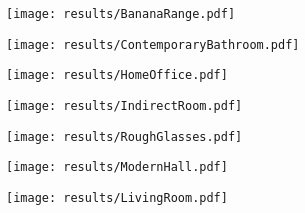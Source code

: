 \documentclass[varwidth=\maxdimen]{standalone}
\begin{document}
\texttt{[image: results/BananaRange.pdf]}

\texttt{[image: results/ContemporaryBathroom.pdf]}

\texttt{[image: results/HomeOffice.pdf]}

\texttt{[image: results/IndirectRoom.pdf]}

\texttt{[image: results/RoughGlasses.pdf]}

\texttt{[image: results/ModernHall.pdf]}

\texttt{[image: results/LivingRoom.pdf]}
\end{document}
